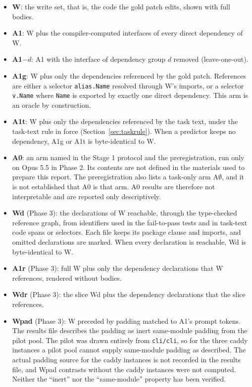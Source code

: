 \begin{itemize}
\item \textbf{W}: the write set, that is, the code the gold patch edits, shown with full bodies.
\item \textbf{A1}: W plus the compiler-computed interfaces of every direct dependency of W.
\item \textbf{A1$-d$}: A1 with the interface of dependency group $d$ removed (leave-one-out).
\item \textbf{A1g}: W plus only the dependencies referenced by the gold patch. References are either a selector \texttt{alias.Name} resolved through W's imports, or a selector \texttt{v.Name} where \texttt{Name} is exported by exactly one direct dependency. This arm is an oracle by construction.
\item \textbf{A1t}: W plus only the dependencies referenced by the task text, under the task-text rule in force (Section~\ref{sec:taskrule}). When a predictor keeps no dependency, A1g or A1t is byte-identical to W.
\item \textbf{A0}: an arm named in the Stage 1 protocol \cite{stage1} and the preregistration, run only on Opus 5.5 in Phase 2. Its contents are not defined in the materials used to prepare this report. The preregistration also lists a task-only arm A$\emptyset$, and it is not established that A0 is that arm. A0 results are therefore not interpretable and are reported only descriptively.
\item \textbf{Wd} (Phase 3): the declarations of W reachable, through the type-checked reference graph, from identifiers used in the fail-to-pass tests and in task-text code spans or selectors. Each file keeps its package clause and imports, and omitted declarations are marked. When every declaration is reachable, Wd is byte-identical to W.
\item \textbf{A1r} (Phase 3): full W plus only the dependency declarations that W references, rendered without bodies.
\item \textbf{Wdr} (Phase 3): the slice Wd plus the dependency declarations that the slice references.
\item \textbf{Wpad} (Phase 3): W preceded by padding matched to A1's prompt tokens. The results file describes the padding as inert same-module padding from the pilot pool. The pilot was drawn entirely from \texttt{cli/cli}, so for the three caddy instances a pilot pool cannot supply same-module padding as described. The actual padding source for the caddy instances is not recorded in the results file, and Wpad contrasts without the caddy instances were not computed. Neither the ``inert'' nor the ``same-module'' property has been verified.
\end{itemize}

